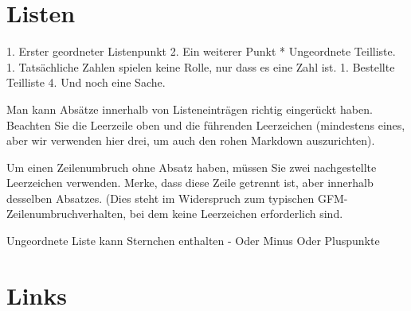 \documentclass[12pt,de-CH,twoside,openright]{report}
\newenvironment{Shaded}{\begin{snugshade}}{\end{snugshade}}
\newcommand{\FloatTok}[1]{\textcolor[rgb]{0.00,0.00,0.81}{#1}}
\newcommand{\NormalTok}[1]{#1}
\begin{document}
\hypertarget{listen}{%
\section{Listen}\label{listen}}

\begin{Shaded}
\begin{Highlighting}[]
\NormalTok{1. }\FloatTok{Erster geordneter Listenpunkt}
\FloatTok{2. Ein weiterer Punkt}
\FloatTok{  * Ungeordnete Teilliste.}
\FloatTok{1. Tatsächliche Zahlen spielen keine Rolle, nur dass es eine Zahl ist.}
\FloatTok{  1. Bestellte Teilliste}
\FloatTok{4. Und noch eine Sache.}

\NormalTok{   Man kann Absätze innerhalb von Listeneinträgen richtig eingerückt haben. Beachten Sie die Leerzeile oben und die führenden Leerzeichen (mindestens eines, aber wir verwenden hier drei, um auch den rohen Markdown auszurichten).}

\NormalTok{   Um einen Zeilenumbruch ohne Absatz haben, müssen Sie zwei nachgestellte Leerzeichen verwenden.  }
\NormalTok{   Merke, dass diese Zeile getrennt ist, aber innerhalb desselben Absatzes.  }
\NormalTok{   (Dies steht im Widerspruch zum typischen GFM-Zeilenumbruchverhalten, bei dem keine Leerzeichen erforderlich sind.}

\NormalTok{Ungeordnete Liste kann Sternchen enthalten}
\NormalTok{- }\FloatTok{Oder Minus}
\FloatTok{Oder Pluspunkte}
\end{Highlighting}
\end{Shaded}

\hypertarget{links}{%
\section{Links}\label{links}}
\end{document}
